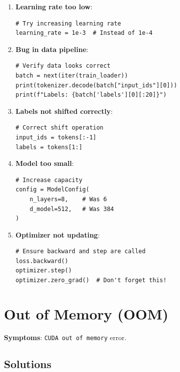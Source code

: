 \begin{enumerate}
    \item \textbf{Learning rate too low}:
    \begin{lstlisting}[style=python]
# Try increasing learning rate
learning_rate = 1e-3  # Instead of 1e-4
    \end{lstlisting}

    \item \textbf{Bug in data pipeline}:
    \begin{lstlisting}[style=python]
# Verify data looks correct
batch = next(iter(train_loader))
print(tokenizer.decode(batch["input_ids"][0]))
print(f"Labels: {batch['labels'][0][:20]}")
    \end{lstlisting}

    \item \textbf{Labels not shifted correctly}:
    \begin{lstlisting}[style=python]
# Correct shift operation
input_ids = tokens[:-1]
labels = tokens[1:]
    \end{lstlisting}

    \item \textbf{Model too small}:
    \begin{lstlisting}[style=python]
# Increase capacity
config = ModelConfig(
    n_layers=8,    # Was 6
    d_model=512,   # Was 384
)
    \end{lstlisting}

    \item \textbf{Optimizer not updating}:
    \begin{lstlisting}[style=python]
# Ensure backward and step are called
loss.backward()
optimizer.step()
optimizer.zero_grad()  # Don't forget this!
    \end{lstlisting}
\end{enumerate}

\section{Out of Memory (OOM)}

\textbf{Symptoms}: \texttt{CUDA out of memory} error.

\subsection{Solutions}

